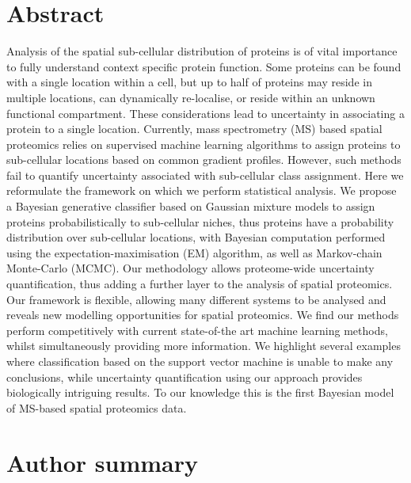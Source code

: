 \documentclass[10pt,letterpaper]{article}\usepackage[]{graphicx}\usepackage[]{color}
\begin{document}
\section*{Abstract}
Analysis of the spatial sub-cellular distribution of proteins is of
vital importance to fully understand context specific protein
function. Some proteins can be found with a single location within a
cell, but up to half of proteins may reside in multiple locations, can
dynamically re-localise, or reside within an unknown functional
compartment. These considerations lead to uncertainty in associating a
protein to a single location. Currently, mass spectrometry (MS) based
spatial proteomics relies on supervised machine learning algorithms to
assign proteins to sub-cellular locations based on common gradient
profiles. However, such methods fail to quantify uncertainty
associated with sub-cellular class assignment. Here we reformulate the
framework on which we perform statistical analysis. We propose a
Bayesian generative classifier based on Gaussian mixture models to
assign proteins probabilistically to sub-cellular niches, thus
proteins have a probability distribution over sub-cellular locations,
with Bayesian computation performed using the expectation-maximisation
(EM) algorithm, as well as Markov-chain Monte-Carlo (MCMC). Our
methodology allows proteome-wide uncertainty quantification, thus
adding a further layer to the analysis of spatial proteomics. Our
framework is flexible, allowing many different systems to be analysed
and reveals new modelling opportunities for spatial proteomics. We
find our methods perform competitively with current state-of-the art
machine learning methods, whilst simultaneously providing more
information. We highlight several examples where classification based
on the support vector machine is unable to make any conclusions, while
uncertainty quantification using our approach provides biologically
intriguing results.  To our knowledge this is the first Bayesian model
of MS-based spatial proteomics data.

\section*{Author summary}
\end{document}
